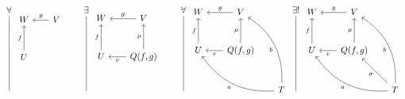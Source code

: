 \documentclass[12pt]{amsart}
\theoremstyle{definition}
\begin{document}
\begin{enumerate}
    \[
    \begin{tikzcd}[row sep=1cm, column sep=.7cm]
     \forall\arrow[ddd, dash]\\
     \\
     \\
     \;
    \end{tikzcd} 
    \begin{tikzcd}[row sep=1cm, column sep=.65cm]
     W& V\arrow[l,"g"']\\
     U\arrow[u, "f"]&\\
     & & 
    \end{tikzcd}
    \begin{tikzcd}[row sep=1cm, column sep=.7cm]
     \exists\arrow[ddd, dash]\\
     \\
     \\
     \;
    \end{tikzcd} 
    \begin{tikzcd}[row sep=1cm, column sep=.65cm]
     W& V\arrow[l,"g"']\\
     U\arrow[u, "f"]& Q(f,g)\arrow[u, "\mu"]\arrow[l, "v"]\\
     & & 
    \end{tikzcd}
    \begin{tikzcd}[row sep=1cm, column sep=.7cm]
     \forall\arrow[ddd, dash,]\\
     \\
     \\
     \;
    \end{tikzcd}
    \begin{tikzcd}[row sep=1cm, column sep=.65cm]
     W& V\arrow[l,"g"']\\
     U\arrow[u, "f"]& Q(f,g)\arrow[u, "\mu"]\arrow[l, "v"]\\
     & & T\arrow[ull, "a", bend left]\arrow[uul, "b", bend right]
    \end{tikzcd}
    \begin{tikzcd}[row sep=1cm, column sep=.7cm]
     \exists!\arrow[ddd, dash]\\
     \\
     \\
     \;
    \end{tikzcd}
    \begin{tikzcd}[row sep=1cm, column sep=.65cm]
     W& V\arrow[l,"g"']\\
     U\arrow[u, "f"]& Q(f,g)\arrow[u, "\mu"]\arrow[l, "v"]\\
     & & T\arrow[ull, "a", bend left]\arrow[uul, "b", bend right]\arrow[ul, "\sigma"]
    \end{tikzcd}
    \]


\end{enumerate}
\end{document}
